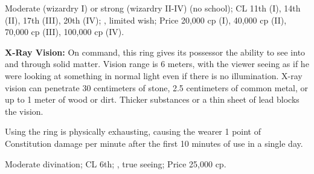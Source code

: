Moderate (wizardry I) or strong (wizardry II-IV) (no school); CL 11th (I), 14th (II), 17th (III), 20th (IV); , limited wish; Price 20,000 cp (I), 40,000 cp (II), 70,000 cp (III), 100,000 cp (IV).


\textbf{X-Ray Vision:} On command, this ring gives its possessor the ability to see into and through solid matter. Vision range is 6 meters, with the viewer seeing as if he were looking at something in normal light even if there is no illumination. X-ray vision can penetrate 30 centimeters of stone, 2.5 centimeters of common metal, or up to 1 meter of wood or dirt. Thicker substances or a thin sheet of lead blocks the vision.

Using the ring is physically exhausting, causing the wearer 1 point of Constitution damage per minute after the first 10 minutes of use in a single day.

Moderate divination; CL 6th; , true seeing; Price 25,000 cp.

